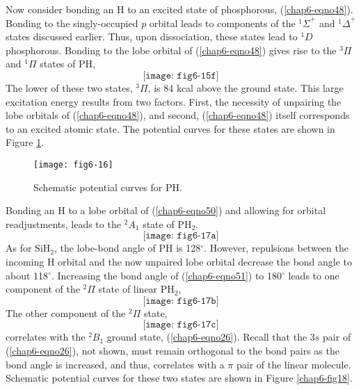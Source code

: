 Now consider bonding an H to an excited state of phosphorous,
(\ref{chap6-eqno48}).  Bonding to the singly-occupied $p$ orbital
leads to components of the ${^1\Sigma}^+$ and ${^1\Delta}^+$ states
discussed earlier.  Thus, upon dissociation, these states lead to
${^1D}$ phosphorous. Bonding to the lobe orbital of
(\ref{chap6-eqno48}) gives rise to the ${^3\Pi}$ and ${^1\Pi}$ states
of PH,
\begin{equation}
\texttt{[image: fig6-15f]}
\end{equation}
The lower of these two states, ${^3\Pi}$, is 84 kcal above the ground
state.  This large excitation energy results from two factors.  First,
the necessity of unpairing the lobe orbitals of (\ref{chap6-eqno48}),
and second, (\ref{chap6-eqno48}) itself corresponds to an excited
atomic state.  The potential curves for these states are shown in
Figure \ref{chap6-fig17}.

\begin{figure}
\begin{center}
\texttt{[image: fig6-16]}
\end{center}
\caption{Schematic potential curves for PH.}
\label{chap6-fig17}
\end{figure}

Bonding an H to a lobe orbital of (\ref{chap6-eqno50}) and allowing
for orbital readjustments, leads to the ${^2A}_1$ state of PH$_2$.
\begin{equation}
\texttt{[image: fig6-17a]}
\label{chap6-eqno51}
\end{equation}
As for SiH$_2$, the lobe-bond angle of PH is 128$^{\circ}$.  However,
repulsions between the incoming H orbital and the now unpaired lobe
orbital decrease the bond angle to about 118$^{\circ}$.  Increasing
the bond angle of (\ref{chap6-eqno51}) to 180$^{\circ}$ leads to one
component of the ${^2\Pi}$ state of linear PH$_2$,
\begin{equation}
\texttt{[image: fig6-17b]}
\end{equation}
The other component of the  ${^2\Pi}$ state,
\begin{equation}
\texttt{[image: fig6-17c]}
\end{equation}
correlates with the ${^2B}_1$ ground state,
(\ref{chap6-eqno26}). Recall that the $3s$ pair of
(\ref{chap6-eqno26}), not shown, must remain orthogonal to the bond
pairs as the bond angle is increased, and thus, correlates with a
$\pi$ pair of the linear molecule.  Schematic potential curves for
these two states are shown in Figure \ref{chap6-fig18}.

